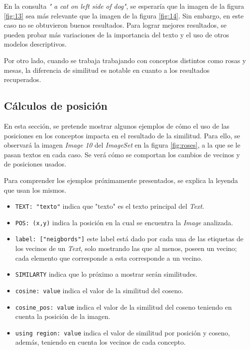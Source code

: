 En la consulta \textit{" a cat on left side of dog"}, se esperaría que la imagen de la figura \ref{fig:13} sea m\'as relevante que la imagen de la figura \ref{fig:14}. Sin embargo, en este caso no se obtuvieron buenos resultados. Para lograr mejores resultados, se pueden probar m\'as variaciones de la importancia del texto y el uso de otros modelos descriptivos.

Por otro lado, cuando se trabaja trabajando con conceptos distintos como rosas y mesas, la diferencia de similitud es notable en cuanto a los resultados recuperados.

\subsection{C\'alculos de posici\'on}
En esta sección, se pretende mostrar algunos ejemplos de cómo el uso de las posiciones en los conceptos impacta en el resultado de la similitud. Para ello, se observar\'a la imagen \textit{Image 10} del \textit{ImageSet} en la figura \ref{fig:roses}, a la que se le pasan textos en cada caso. Se ver\'a cómo se comportan los cambios de vecinos y de posiciones usados.

Para comprender los ejemplos próximamente presentados, se explica la leyenda que usan los mismos.

\begin{itemize}
\item \verb|TEXT: "texto"| indica que "texto" es el texto principal del \textit{Text}.
\item \verb|POS: (x,y)| indica la posici\'on en la cual se encuentra la \textit{Image} analizada.
\item \verb|label: ["neigbords"]| este label est\'a dado por cada una de las etiquetas de los vecinos de un \textit{Text}, solo mostrando las que al menos, poseen un vecino; cada elemento que corresponde a esta corresponde a un vecino.
\item \verb|SIMILARTY| indica que lo pr\'oximo a mostrar ser\'an similitudes.
\item \verb|cosine: value| indica el valor de la similitud del coseno.
\item \verb|cosine_pos: value| indica el valor de la similitud del coseno teniendo en cuenta la posici\'on de la imagen.
\item \verb|using region: value| indica el valor de similitud por posici\'on y coseno, adem\'as, teniendo en cuenta los vecinos de cada concepto.
\end{itemize}

